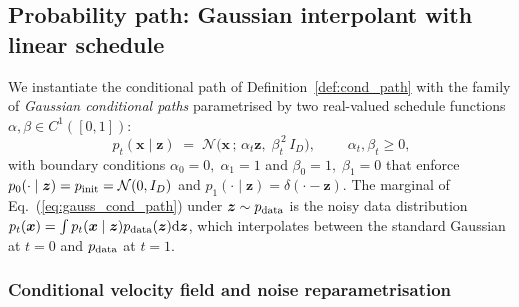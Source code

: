 \documentclass[11pt]{article}
\newcommand{\dd}{\mathrm{d}}
\DeclareRobustCommand{\xvec}{\bm{x}}
\DeclareRobustCommand{\zvec}{\bm{z}}
\newcommand{\pinit}{p_{\rm init}}
\newcommand{\pdata}{p_{\rm data}}
\theoremstyle{definition}
\begin{document}
\subsection{Probability path: Gaussian interpolant with linear schedule}
\label{sec:fm_path}

We instantiate the conditional path of Definition~\ref{def:cond_path} with the family of \emph{Gaussian conditional paths} parametrised by two real-valued schedule functions $\alpha,\beta\in C^1([0,1])$:
\begin{equation}
  \boxed{\;p_t(\xvec\mid\zvec) \;=\; \mathcal N\!\bigl(\xvec\,;\,\alpha_t\zvec,\;\beta_t^{\,2}\,I_D\bigr),\;}
  \qquad
  \alpha_t,\beta_t\geq 0,
  \label{eq:gauss_cond_path}
\end{equation}
with boundary conditions $\alpha_0=0,\;\alpha_1=1$ and $\beta_0=1,\;\beta_1=0$ that enforce $p_0(\cdot\mid\zvec)=\pinit=\mathcal N(0,I_D)$ and $p_1(\cdot\mid\zvec)=\delta(\cdot-\zvec)$. The marginal of Eq.~(\ref{eq:gauss_cond_path}) under $\zvec\sim\pdata$ is the noisy data distribution $p_t(\xvec)=\int p_t(\xvec\mid\zvec)\pdata(\zvec)\dd\zvec$, which interpolates between the standard Gaussian at $t=0$ and $\pdata$ at $t=1$.

\subsubsection{Conditional velocity field and noise reparametrisation}
\end{document}
